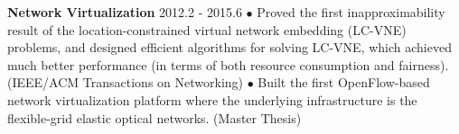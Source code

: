 \documentclass[line,11pt,letter]{includes/cls/myRes}
\begin{document}
\begin{resume}
{\setlength{\parskip}{0pt}
{\bf Network Virtualization} \hfill 2012.2 - 2015.6\break
{\hspace*{1em} $\bullet$ Proved the first inapproximability result of the location-constrained virtual network embedding (LC-VNE) problems, and designed efficient algorithms for solving LC-VNE, which achieved much better performance (in terms of both resource consumption and fairness). (IEEE/ACM Transactions on Networking)\hfill\break}
{\hspace*{1em} $\bullet$ Built the first OpenFlow-based network virtualization platform where the underlying infrastructure is the flexible-grid elastic optical networks. (Master Thesis)\hfill\break}
}
\negspace

\end{resume}
\end{document}
